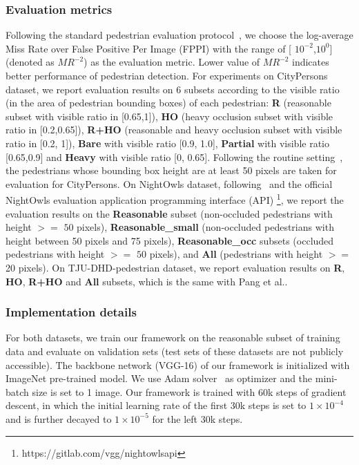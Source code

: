 \documentclass[journal]{IEEEtran}
\begin{document}
\subsubsection{Evaluation metrics}
Following the standard pedestrian evaluation protocol~\cite{dollar2011pedestrian}, we choose the log-average Miss Rate over False Positive Per Image (FPPI)  with the range of [
$10^{-2}$,$10^0$] (denoted as $MR^{-2}$) as the evaluation metric. Lower value of $MR^{-2}$ indicates better performance of pedestrian detection. 
For experiments on CityPersons dataset, we report evaluation results on 6 subsets according to the visible ratio (in the area of pedestrian bounding boxes) of each pedestrian: \textbf{R} (reasonable subset with visible ratio in [0.65,1]),  \textbf{HO} (heavy occlusion subset with visible ratio in [0.2,0.65]), \textbf{R+HO} (reasonable and heavy occlusion subset with visible ratio in [0.2, 1]), \textbf{Bare} with visible ratio [0.9, 1.0], \textbf{Partial} with visible ratio [0.65,0.9] and \textbf{Heavy} with visible ratio [0, 0.65].
Following the routine setting~\cite{xie2020count, wu2020temporal}, the pedestrians whose bounding box height are at least 50 pixels are taken for evaluation for CityPersons. On NightOwls dataset, following~\cite{wu2020temporal,neumann2018nightowls} and the official NightOwls evaluation application programming interface (API) \footnote{https://gitlab.com/vgg/nightowlsapi}, we report the evaluation results on the \textbf{Reasonable} subset (non-occluded pedestrians with height $>=$ $50$ pixels), \textbf{Reasonable\_small} (non-occluded pedestrians  with height between 50 pixels and 75 pixels),  \textbf{Reasonable\_occ} subsets (occluded pedestrians  with height $>=$ $50$ pixels), and \textbf{All} (pedestrians with height $>=$ 20 pixels). 
On TJU-DHD-pedestrian dataset, we report evaluation results on \textbf{R}, \textbf{HO}, \textbf{R+HO} and \textbf{All} subsets, which is the same with Pang et al.\cite{pang2020tju}.










\subsubsection{Implementation details}
For both datasets, we train our framework on the reasonable subset of training data and evaluate on validation sets (test sets of these datasets are not publicly accessible). The backbone network (VGG-16) of our framework is initialized with ImageNet pre-trained model. We use Adam solver~\cite{kingma2014adam} as optimizer and the mini-batch size is set to 1 image. 
Our framework is trained with 60k steps of gradient descent, in which the initial learning rate of the first 30k steps is set to $1 \times 10^{-4}$ and is further decayed to $1 \times 10^{-5}$ for the left 30k steps. 
\end{document}
